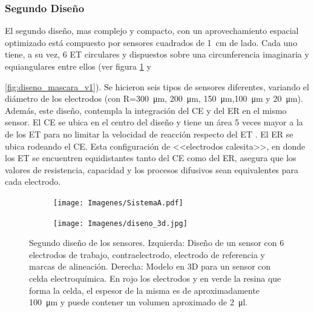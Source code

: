  		 \subsubsection{Segundo Diseño}

		 	 El segundo diseño, mas complejo y compacto, con un aprovechamiento espacial optimizado está compuesto por sensores cuadrados de \SI{1}{\cm} de lado. Cada uno tiene, a su vez, 6 ET circulares y dispuestos sobre una circunferencia imaginaria y equiangulares entre ellos (ver figura \ref{fig:mascara_diseno_v2} y {\ref{fig:diseno_mascara_v1}). Se hicieron seis tipos de sensores diferentes, variando el diámetro de los electrodos (con R=\SI{300}{\um}, \SI{200}{\um}, \SI{150}{\um},\SI{100}{\um} y \SI{20}{\um}). Además, este diseño, contempla la integración del CE y del ER en el mismo sensor. El CE se ubica en el centro del diseño y tiene un área 5 veces mayor a la de los ET para no limitar la velocidad de reacción respecto del ET \cite{Wi2000}. El ER se ubica rodeando el CE. Esta configuración de <<electrodos calesita>>, en donde los ET se encuentren equidistantes tanto del CE como del ER, asegura que los valores de resistencia, capacidad y los procesos difusivos sean equivalentes para cada electrodo.

			     \begin{figure}[th!]
			 	    \begin{subfigure}[t]{0.395\textwidth}
			       	\texttt{[image: Imagenes/SistemaA.pdf]}
			    	\end{subfigure}
					\begin{subfigure}[t]{0.595\textwidth}
			        \texttt{[image: Imagenes/diseno\_3d.jpg]}
			        \end{subfigure}
			     	\caption[Segundo diseño y máscara de los sensores]{Segundo diseño de los sensores. Izquierda: Diseño de un sensor con 6 electrodos de trabajo, contraelectrodo, electrodo de referencia y marcas de alineación. Derecha: Modelo en 3D para un sensor con celda electroquímica. En rojo los electrodos y en verde la resina que forma la celda, el espesor de la misma es de aproximadamente \SI{100}{\um} y puede contener un volumen aproximado de \SI{2}{\ul}.}
			     	\label{fig:mascara_diseno_v2}
			     	\end{figure}
	   
}
